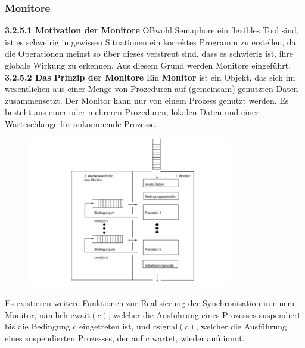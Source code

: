 \documentclass{article}
\begin{document}
\subsubsection{Monitore}
    \textbf{3.2.5.1 Motivation der Monitore}\newline
    OBwohl Semaphore ein flexibles Tool sind, ist es schweirig in gewissen Situationen ein korrektes Programm zu erstellen, da die Operationen meinst so über dieses verstreut sind, dass es schwierig ist, ihre globale Wirkung zu erkennen. Aus diesem Grund werden Monitore eingeführt.\newline
    \\
    \textbf{3.2.5.2 Das Prinzip der Monitore}\newline
    Ein \textbf{Monitor} ist ein Objekt, das sich im wesentlichen aus einer Menge von Prozeduren auf (gemeinsam) genutzten Daten zusammensetzt. Der Monitor kann nur von einem Prozess genutzt werden. Es besteht aus einer oder mehreren Prozeduren, lokalen Daten und einer Warteschlange für ankommende Prozesse.
    \begin{figure}[H]
        \centering
	    \includegraphics[width=90mm]{Skizzen/3_Kapitel/monitor.png}
    \end{figure}\newline
    Es existieren weitere Funktionen zur Realisierung der Synchronisation in einem Monitor, nämlich $\text{cwait}(c)$, welcher die Ausführung eines Prozesses suspendiert bis die Bedingung c eingetreten ist, und $\text{csignal}(c)$, welcher die Ausführung eines suspendierten Prozesses, der auf c wartet, wieder aufnimmt.
\end{document}

